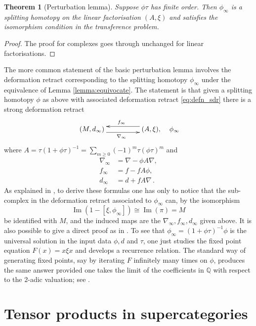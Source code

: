 \documentclass[english,letter paper,12pt,leqno]{article}
\newtheorem{theorem}{Theorem}[section]
\theoremstyle{example}
\numberwithin{equation}{section}
\def\im{\operatorname{Im}}
\begin{document}
\begin{theorem}[Perturbation lemma]\label{theorem:pertlemma} Suppose $\phi \tau$ has finite order. Then $\phi_\infty$ is a splitting homotopy on the linear factorisation $(A, \xi)$ and satisfies the isomorphism condition in the transference problem.
\end{theorem}
\begin{proof}
The proof for complexes \cite[p.886]{barneslambe} goes through unchanged for linear factorisations.
\end{proof}

The more common statement of the basic perturbation lemma involves the deformation retract corresponding to the splitting homotopy $\phi_\infty$ under the equivalence of Lemma \ref{lemma:equivocate}. The statement is that given a splitting homotopy $\phi$ as above with associated deformation retract \eqref{eq:defn_sdr} there is a strong deformation retract
\begin{equation}\label{eq:perturbedsdr}
\xymatrix@C+2pc{
(M,d_\infty) \ar@<-1ex>[r]_{\nabla_\infty} & (A, \xi), \ar@<-1ex>[l]_{f_\infty}
} \quad \phi_\infty
\end{equation}
where $A = \tau( 1 + \phi \tau )^{-1} = \sum_{m \ge 0} (-1)^m \tau (\phi \tau)^m$ and
\begin{align*}
\nabla_\infty &= \nabla - \phi A \nabla,\\
f_\infty &= f - f A \phi,\\
d_\infty &= d + f A \nabla\,.
\end{align*}
As explained in \cite{barneslambe}, to derive these formulas one has only to notice that the sub-complex in the deformation retract associated to $\phi_\infty$ can, by the isomorphism
\[
\im(1 - [\xi, \phi_\infty]) \cong \im(\pi) = M
\]
be identified with $M$, and the induced maps are the $\nabla_\infty, f_\infty, d_\infty$ given above. It is also possible to give a direct proof as in \cite{crainic}. To see that $\phi_\infty = (1 + \phi \tau)^{-1} \phi$ is the universal solution in the input data $\phi, d$ and $\tau$, one just studies the fixed point equation $F(x) = x \xi x$ and develops a recurrence relation. The standard way of generating fixed points, say by iterating $F$ infinitely many times on $\phi$, produces the same answer provided one takes the limit of the coefficients in $\mathbb{Q}$ with respect to the $2$-adic valuation; see \cite[p.885]{barneslambe}.

\section{Tensor products in supercategories}\label{section:tensorproduct_supcat}
\end{document}
